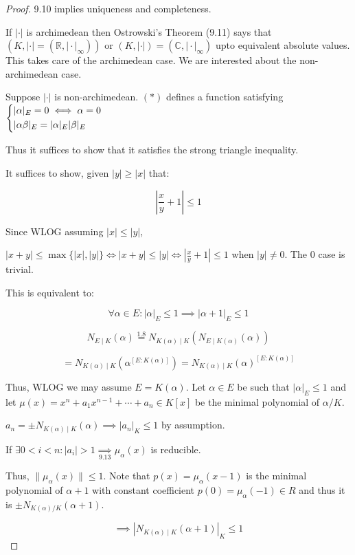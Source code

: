 \documentclass[openany]{amsbook}
\numberwithin{section}{chapter}
\theoremstyle{definition}
\begin{document}
\begin{proof}
    9.10 implies uniqueness and completeness.

    If \(\vert \cdot \vert\) is archimedean then Ostrowski's Theorem (9.11) says that \((K, \vert \cdot \vert = (\mathbb{R}, \vert \cdot \vert_\infty))\) or \((K,\vert \cdot \vert)=(\mathbb{C}, \vert \cdot \vert _\infty)\) upto equivalent absolute values. This takes care of the archimedean case. We are interested about the non-archimedean case.

    Suppose \(\vert \cdot \vert\) is non-archimedean. \((\ast)\) defines a function satisfying \(\begin{dcases}
        \vert \alpha  \vert _E = 0 \iff \alpha = 0\\
        \vert \alpha \beta \vert _E = \vert \alpha \vert _E \vert \beta \vert _E
    \end{dcases}\) 

    Thus it suffices to show that it satisfies the strong triangle inequality.

    It suffices to show, given \(\vert y \vert \geq \vert x \vert\) that:

    \[
        \left\vert \frac{x}{y} + 1 \right\vert \leq 1
    \]

    Since WLOG assuming \(\vert x \vert \leq \vert y \vert\),

    \(\vert x+y \vert \leq \max \{ \vert x \vert, \vert y \vert  \} \iff \vert x+y \vert \leq \vert y \vert \iff \left\vert \frac{x}{y} + 1 \right\vert \leq 1\) when \(\vert y \vert \neq 0\). The \(0\) case is trivial.

    This is equivalent to:

    \[
        \forall \alpha \in E : \vert \alpha \vert _E \leq 1 \implies \vert \alpha + 1 \vert _E \leq 1
    \]

    \[
        N_{E \mid K}(\alpha) \overset{1.8}{=} N_{K(\alpha) \mid K}(N_{E \mid K(\alpha)}(\alpha))
    \]

    \[
        = N_{K(\alpha) \mid K}(\alpha^{[E:K(\alpha)]}) = N_{K(\alpha)\mid K}(\alpha)^{[E:K(\alpha)]}
    \]

    Thus, WLOG we may assume \(E = K(\alpha)\). Let \(\alpha \in E\) be such that \(\vert \alpha \vert _E \leq 1\) and let \(\mu(x) = x^n + a_1 x^{n-1} + \cdots + a_n \in K[x]\) be the minimal polynomial of \(\alpha / K\).
    
    \(a_n = \pm N_{K(\alpha)\mid K}(\alpha) \implies \vert a_n \vert _K \leq 1\) by assumption.

    If \(\exists 0 < i < n : \vert a_i \vert > 1 \underset{9.13}{\implies} \mu_{\alpha}(x)\) is reducible. 

    Thus, \(\lVert \mu_\alpha(x) \rVert \leq 1\). Note that \(p(x) = \mu_\alpha(x-1)\) is the minimal polynomial of \(\alpha+ 1\) with constant coefficient \(p(0)=\mu_\alpha(-1) \in R\) and thus it is \(\pm N_{K(\alpha) / K}(\alpha + 1)\).

    \[
        \implies \left\vert N_{K(\alpha)\mid K}(\alpha+1) \right\vert _K \leq 1
    \]

\end{proof}
\end{document}
